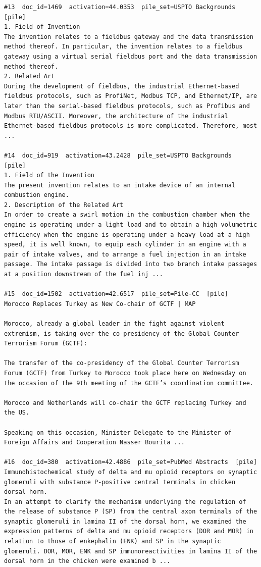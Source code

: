 \begin{verbatim}
#13  doc_id=1469  activation=44.0353  pile_set=USPTO Backgrounds  [pile]
1. Field of Invention
The invention relates to a fieldbus gateway and the data transmission method thereof. In particular, the invention relates to a fieldbus gateway using a virtual serial fieldbus port and the data transmission method thereof.
2. Related Art
During the development of fieldbus, the industrial Ethernet-based fieldbus protocols, such as ProfiNet, Modbus TCP, and Ethernet/IP, are later than the serial-based fieldbus protocols, such as Profibus and Modbus RTU/ASCII. Moreover, the architecture of the industrial Ethernet-based fieldbus protocols is more complicated. Therefore, most ...

#14  doc_id=919  activation=43.2428  pile_set=USPTO Backgrounds  [pile]
1. Field of the Invention
The present invention relates to an intake device of an internal combustion engine.
2. Description of the Related Art
In order to create a swirl motion in the combustion chamber when the engine is operating under a light load and to obtain a high volumetric efficiency when the engine is operating under a heavy load at a high speed, it is well known, to equip each cylinder in an engine with a pair of intake valves, and to arrange a fuel injection in an intake passage. The intake passage is divided into two branch intake passages at a position downstream of the fuel inj ...

#15  doc_id=1502  activation=42.6517  pile_set=Pile-CC  [pile]
Morocco Replaces Turkey as New Co-chair of GCTF | MAP

Morocco, already a global leader in the fight against violent extremism, is taking over the co-presidency of the Global Counter Terrorism Forum (GCTF):

The transfer of the co-presidency of the Global Counter Terrorism Forum (GCTF) from Turkey to Morocco took place here on Wednesday on the occasion of the 9th meeting of the GCTF’s coordination committee.

Morocco and Netherlands will co-chair the GCTF replacing Turkey and the US.

Speaking on this occasion, Minister Delegate to the Minister of Foreign Affairs and Cooperation Nasser Bourita ...

#16  doc_id=380  activation=42.4886  pile_set=PubMed Abstracts  [pile]
Immunohistochemical study of delta and mu opioid receptors on synaptic glomeruli with substance P-positive central terminals in chicken dorsal horn.
In an attempt to clarify the mechanism underlying the regulation of the release of substance P (SP) from the central axon terminals of the synaptic glomeruli in lamina II of the dorsal horn, we examined the expression patterns of delta and mu opioid receptors (DOR and MOR) in relation to those of enkephalin (ENK) and SP in the synaptic glomeruli. DOR, MOR, ENK and SP immunoreactivities in lamina II of the dorsal horn in the chicken were examined b ...


\end{verbatim}
